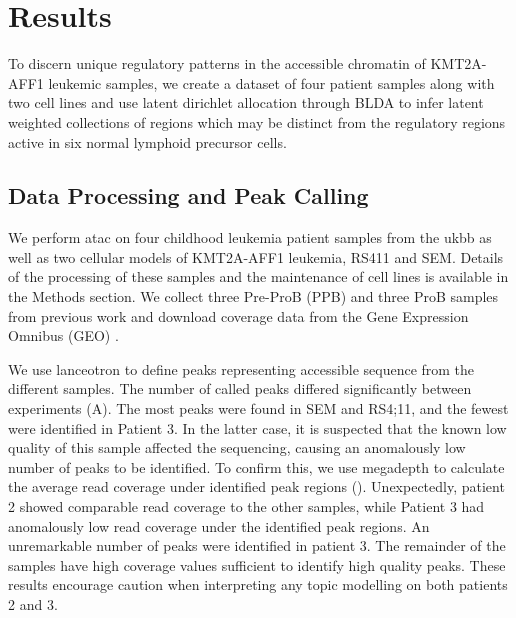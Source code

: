 \section{Results} \label{ch5:results}

To discern unique regulatory patterns in the accessible chromatin of KMT2A-AFF1 leukemic samples, we create a dataset of four patient samples along with two cell lines and use latent dirichlet allocation through BLDA to infer latent weighted collections of regions which may be distinct from the regulatory regions active in six normal lymphoid precursor cells.  

\subsection{Data Processing and Peak Calling}

We perform \gls{atac} on four childhood leukemia patient samples from the \gls{ukbb} as well as two cellular models of KMT2A-AFF1 leukemia, RS411 and SEM. Details of the processing of these samples and the maintenance of cell lines is available in the Methods section. We collect three Pre-ProB (PPB) and three ProB samples from previous work and download coverage data from the Gene Expression Omnibus (GEO) \cite{OByrne2019}.  


We use lanceotron to define peaks representing accessible sequence from the different samples. The number of called peaks differed significantly between experiments (A). The most peaks were found in SEM and RS4;11, and the fewest were identified in Patient 3. In the latter case, it is suspected that the known low quality of this sample affected the sequencing, causing an anomalously low number of peaks to be identified. To confirm this, we use megadepth to calculate the average read coverage under identified peak regions \cite{Wilks2021} (). Unexpectedly, patient 2 showed comparable read coverage to the other samples, while Patient 3 had anomalously low read coverage under the identified peak regions. An unremarkable number of peaks were identified in patient 3. The remainder of the samples have high coverage values sufficient to identify high quality peaks. These results encourage caution when interpreting any topic modelling on both patients 2 and 3.  


